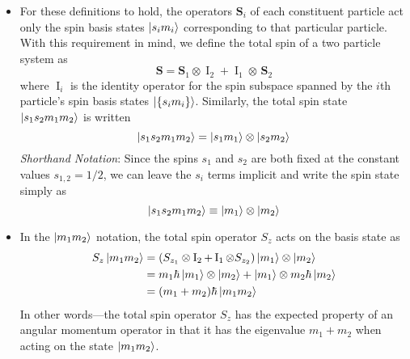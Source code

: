 \documentclass[11pt, a4paper]{article}
\renewcommand{\vec}[1]{\bm{#1}}  %
\renewcommand{\S}{\vec{S}}  %
\newcommand{\II}{\operatorname{I}}  %
\begin{document}
\begin{itemize}
	\item For these definitions to hold, the operators $ \S_{i} $ of each constituent particle act only the spin basis states $ \ket{s_{i}m_{i}} $ corresponding to that particular particle. With this requirement in mind, we define the total spin of a two particle system as
	\begin{equation*}
		\S = \S_{1}\otimes \II_{2} + \II_{1} \otimes \, \S_{2}
	\end{equation*}
	where $ \II_{i} $ is the identity operator for the spin subspace spanned by the $ i $th particle's spin basis states $ \ket{\{s_{i}m_{i}\}} $. Similarly, the total spin state $ \ket{s_{1}s_{2}m_{1}m_{2}} $ is written
	\begin{equation*}
		\ket{s_{1}s_{2}m_{1}m_{2}}  = \ket{s_{1}m_{1}} \otimes \ket{s_{2}m_{2}} 
	\end{equation*}
	\textit{Shorthand Notation}: Since the spins $ s_{1} $ and $ s_{2} $ are both fixed at the constant values $ s_{1,2} = 1/2 $, we can leave the $ s_{i} $ terms implicit and write the spin state simply as
    \begin{equation*}
        \ket{s_{1}s_{2}m_{1}m_{2}} \equiv \ket{m_{1}} \otimes \ket{m_{2}} 
    \end{equation*}
        
    \item In the $ \ket{m_{1}m_{2}} $ notation, the total spin operator $ S_{z} $ acts on the basis state as
    \begin{align*}
        S_{z}\ket{m_{1}m_{2}} &= (S_{z_{1}}\otimes \II_{2} + \II_{1}\otimes S_{z_{2}})\ket{m_{1}} \otimes \ket{m_{2}}\\
        &= m_{1}\hbar \ket{m_{1}} \otimes \ket{m_{2}} + \ket{m_{1}}\otimes m_{2}\hbar \ket{m_{2}}\\
        &=(m_{1} + m_{2}) \hbar \ket{m_{1}m_{2}}
    \end{align*}
    In other words---the total spin operator $ S_{z} $ has the expected property of an angular momentum operator in that it has the eigenvalue $ m_{1} + m_{2} $ when acting on the state $ \ket{m_{1}m_{2}} $. 


\end{itemize}
\end{document}
